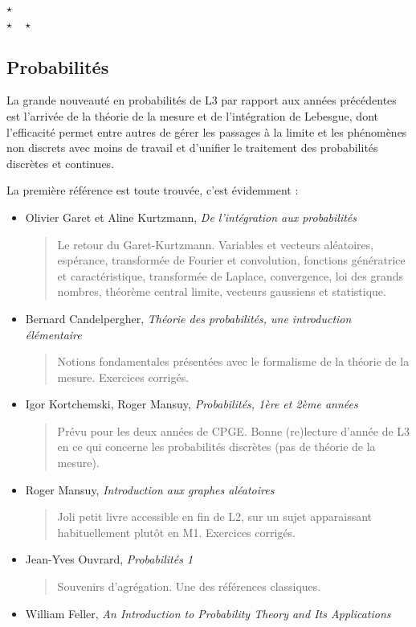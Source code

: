 \documentclass{article}
\def\separateur{\begin{center}
$\star$\\
$\star\quad\star$
\end{center}}
\begin{document}
\separateur
\subsection{Probabilités}


La grande nouveauté en probabilités de L3 par rapport aux années précédentes est l'arrivée de la théorie de la mesure et de l'intégration de Lebesgue, dont l'efficacité permet entre autres de gérer les passages à la limite et les phénomènes non discrets avec moins de travail et d'unifier le traitement des probabilités discrètes et continues.


La première référence est toute trouvée, c'est évidemment : 

\begin{mdframed}
\begin{itemize}
\item Olivier Garet et Aline Kurtzmann, \emph{De l'intégration aux probabilités}
\begin{quote}
Le retour du Garet-Kurtzmann. Variables et vecteurs aléatoires, espérance, transformée de Fourier et convolution, fonctions génératrice et caractéristique, transformée de Laplace, convergence, loi des grands nombres, théorème central limite, vecteurs gaussiens et statistique.
\end{quote}
\end{itemize}
\end{mdframed}

\begin{itemize}
\item Bernard Candelpergher, \emph{Théorie des probabilités, une introduction élémentaire}
\begin{quote}
Notions fondamentales présentées avec le formalisme de la théorie de la mesure. Exercices corrigés.
\end{quote}
\item Igor Kortchemski, Roger Mansuy, \emph{Probabilités, 1ère et 2ème années}
\begin{quote}
Prévu pour les deux années de CPGE. Bonne (re)lecture d'année de L3 en ce qui concerne les probabilités discrètes (pas de théorie de la mesure).
\end{quote}
\item Roger Mansuy, \emph{Introduction aux graphes aléatoires}
\begin{quote}
Joli petit livre accessible en fin de L2, sur un sujet apparaissant habituellement plutôt en M1. Exercices corrigés.
\end{quote}
\item Jean-Yves Ouvrard, \emph{Probabilités 1}
\begin{quote}
Souvenirs d'agrégation. Une des références classiques.
\end{quote}
\item William Feller, \emph{An Introduction to Probability Theory and Its Applications}
\end{itemize}
\end{document}
